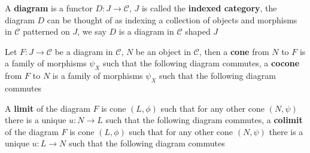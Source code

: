 \documentclass[main]{subfiles}
\begin{document}
\begin{definition}
A \textbf{diagram} is a functor $D:J\to \mathscr C$, $J$ is called the \textbf{indexed category}, the diagram $D$ can be thought of as indexing a collection of objects and morphisms in $\mathscr C$ patterned on $J$, we say $D$ is a diagram in $\mathscr C$ shaped $J$ \par
Let $F:J\to\mathscr C$ be a diagram in $\mathscr C$, $N$ be an object in $\mathscr C$, then a \textbf{cone} from $N$ to $F$ is a family of morphisms $\psi_X$ such that the following diagram commutes, a \textbf{cocone} from $F$ to $N$ is a family of morphisms $\psi_X$ such that the following diagram commutes
\begin{center}
\end{center}
A \textbf{limit} of the diagram $F$ is cone $(L,\phi)$ such that for any other cone $(N,\psi)$ there is a unique $u:N\to L$ such that the following diagram commutes, a \textbf{colimit} of the diagram $F$ is cone $(L,\phi)$ such that for any other cone $(N,\psi)$ there is a unique $u:L\to N$ such that the following diagram commutes
\begin{center}
\end{center}
\end{definition}
\end{document}
